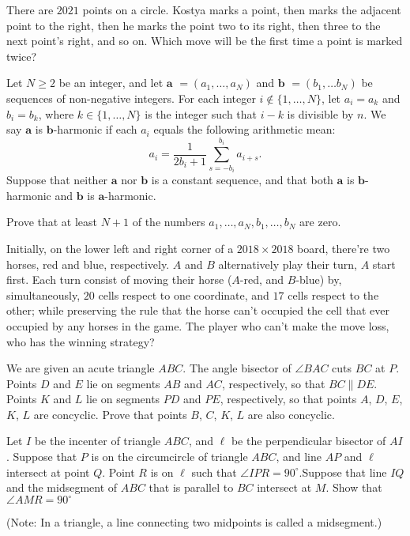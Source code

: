 \documentclass[11pt]{scrartcl}
\begin{document}
\begin{problem}[4742951979457606021]
There are $2021$ points on a circle. Kostya marks a point, then marks the adjacent point to the right, then he marks the point two to its right, then three to the next point's right, and so on. Which move will be the first time a point is marked twice?
\end{problem}
\begin{problem}[8059299736482475200]
Let $N \geq 2$ be an integer, and let $\mathbf a$ $= (a_1, \ldots, a_N)$ and $\mathbf b$ $= (b_1, \ldots b_N)$ be sequences of non-negative integers. For each integer $i \not \in \{1, \ldots, N\}$, let $a_i = a_k$ and $b_i = b_k$, where $k \in \{1, \ldots, N\}$ is the integer such that $i-k$ is divisible by $n$. We say $\mathbf a$ is $\mathbf b$-harmonic if each $a_i$ equals the following arithmetic mean:\[a_i = \frac{1}{2b_i+1} \sum_{s=-b_i}^{b_i} a_{i+s}.\]Suppose that neither $\mathbf a $ nor $\mathbf b$ is a constant sequence, and that both $\mathbf a$ is $\mathbf b$-harmonic and $\mathbf b$ is $\mathbf a$-harmonic.

Prove that at least $N+1$ of the numbers $a_1, \ldots, a_N,b_1, \ldots, b_N$ are zero.
\end{problem}
\begin{problem}[1637184643761804371]
Initially, on the lower left and right corner of a $2018\times 2018$ board, there're two horses, red and blue, respectively. $A$ and $B$ alternatively play their turn, $A$ start first. Each turn consist of moving their horse ($A$-red, and $B$-blue) by, simultaneously, $20$ cells respect to one coordinate, and $17$ cells respect to the other; while preserving the rule that the horse can't occupied the cell that ever occupied by any horses in the game. The player who can't make the move loss, who has the winning strategy?
\end{problem}
\begin{problem}[748681263295975]
We are given an acute triangle $ABC$. The angle bisector of $\angle BAC$ cuts $BC$ at $P$. Points $D$ and $E$ lie on segments $AB$ and $AC$, respectively, so that $BC \parallel  DE$. Points $K$ and $L$ lie on segments $PD$ and $PE$, respectively, so that points $A$, $D$, $E$, $K$, $L$ are concyclic. Prove that points $B$, $C$, $K$, $L$ are also concyclic.
\end{problem}
\begin{problem}[908587245178389]
Let $I$ be the incenter of triangle $ABC$, and $\ell$ be the perpendicular bisector of $AI$. Suppose that $P$ is on the circumcircle of triangle $ABC$, and line $AP$ and $\ell$ intersect at point $Q$. Point $R$ is on $\ell$ such that $\angle IPR = 90^{\circ}$.Suppose that line $IQ$ and the midsegment of $ABC$ that is parallel to $BC$ intersect at $M$. Show that $\angle AMR = 90^{\circ}$

(Note: In a triangle, a line connecting two midpoints is called a midsegment.)
\end{problem}
\end{document}
